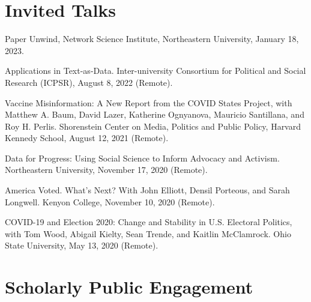 \documentclass[letterpaper]{article}
\renewenvironment{itemize}{
  \begin{list}{}{
    \setlength{\leftmargin}{1.5em}
  }
}{
  \end{list}
}
\begin{document}
\section*{Invited Talks}
\begin{itemize}

\item Paper Unwind, Network Science Institute, Northeastern University, January 18, 2023.

\item Applications in Text-as-Data. Inter-university Consortium for Political and Social Research (ICPSR), August 8, 2022 (Remote). 

\item Vaccine Misinformation: A New Report from the COVID States Project, with Matthew A. Baum, David Lazer, Katherine Ognyanova, Mauricio Santillana, and Roy H. Perlis. Shorenstein Center on Media, Politics and Public Policy, Harvard Kennedy School, August 12, 2021 (Remote).

\item Data for Progress: Using Social Science to Inform Advocacy and Activism. Northeastern University, November 17, 2020 (Remote). 

\item America Voted. What's Next? With John Elliott, Densil Porteous, and Sarah Longwell. Kenyon College, November 10, 2020 (Remote). 

\item COVID-19 and Election 2020: Change and Stability in U.S. Electoral Politics, with Tom Wood, Abigail Kielty, Sean Trende, and Kaitlin McClamrock. Ohio State University, May 13, 2020 (Remote).
 
\end{itemize}

\section*{Scholarly Public Engagement}
\end{document}
